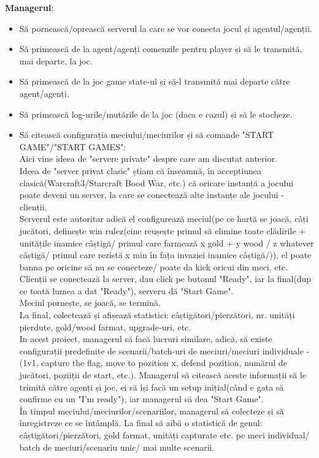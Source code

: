 \documentclass[12pt]{article}
\begin{document}
\textbf{Managerul}:\\
\begin{itemize}
    \item Să pornească/oprească serverul la care se vor conecta jocul și agentul/agenții.
    \item Să primească de la agent/agenți comenzile pentru player și să le transmită, mai departe, la joc.
    \item Să primească de la joc game state-ul și să-l transmită mai departe către agent/agenți.
    \item Să primească log-urile/mutările de la joc (daca e cazul) și să le stocheze.
    \item Să citească configurația meciului/meciurilor și să comande "START GAME"/"START GAMES":\\
    Aici vine ideea de "servere private" despre care am discutat anterior.\\
    Ideea de "server privat clasic" știam că înseamnă, în acceptiunea clasică(Warcraft3/Starcraft Bood War, etc.) că oricare instanță a jocului poate deveni un server, la care se conectează alte instanțe ale jocului - clienții.\\
    Serverul este autoritar adică el configurează meciul(pe ce hartă se joacă, câți jucători, definește win rulez(cine reușește primul să elimine toate clădirile + unitățile inamice câștigă/ primul care farmează x gold + y wood / z whatever câștigă/ primul care rezistă x min în fața invaziei inamice câștigă/)), el poate banna pe oricine să nu se conecteze/ poate da kick oricui din meci, etc. Clienții se conectează la server, dau click pe butonul "Ready", iar la final(dup ce toată lumea a dat "Ready"), serveru dă "Start Game".\\
    Meciul pornește, se joacă, se termină.\\
    La final, colectează și afișează statistici: câștigători/pierzători, nr. unități pierdute, gold/wood farmat, upgrade-uri, etc.\\
    In acest proiect, managerul să facă lucruri similare, adică, să existe configurații predefinite de scenarii/batch-uri de meciuri/meciuri individuale - (1v1, capture the flag, move to pozition x, defend pozition, numărul de jucători, poziiții de start, etc.). Managerul să citească aceste informații să le trimită către agenți și joc, ei să își facă un setup inițial(când e gata să confirme cu un "I'm ready"), iar managerul să dea "Start Game".\\
    În timpul meciului/meciurilor/scenariilor, managerul să colecteze și să înregistreze ce se întâmplă. La final să aibă o statistică de genul: câștigători/pierzători, gold farmat, unități capturate etc. pe meci individual/ batch de meciuri/scenariu unic/ mai multe scenarii.\\

\end{itemize}
\end{document}
